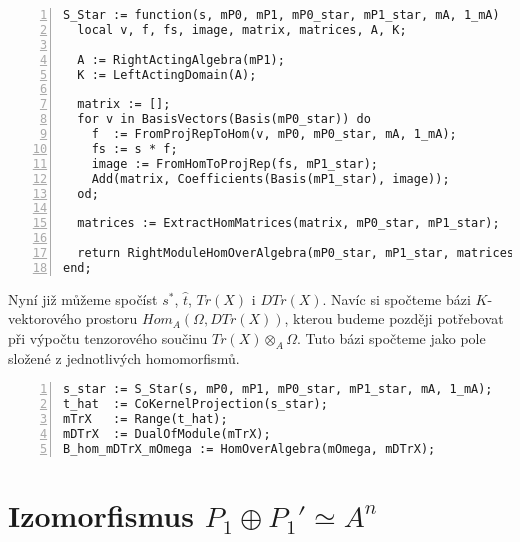       \begin{Verbatim}[frame=single,numbers=left]
S_Star := function(s, mP0, mP1, mP0_star, mP1_star, mA, 1_mA)
  local v, f, fs, image, matrix, matrices, A, K;

  A := RightActingAlgebra(mP1);
  K := LeftActingDomain(A);

  matrix := [];
  for v in BasisVectors(Basis(mP0_star)) do
    f  := FromProjRepToHom(v, mP0, mP0_star, mA, 1_mA);
    fs := s * f;
    image := FromHomToProjRep(fs, mP1_star);
    Add(matrix, Coefficients(Basis(mP1_star), image));
  od;

  matrices := ExtractHomMatrices(matrix, mP0_star, mP1_star);

  return RightModuleHomOverAlgebra(mP0_star, mP1_star, matrices);
end;        
      \end{Verbatim}
      
      
      Nyní již můžeme spočíst $s^*$, $\hat t$, $Tr(X)$ i $DTr(X)$. Navíc si spočteme 
      bázi $K$-vektorového prostoru $Hom_A(\Omega, DTr(X))$, kterou budeme 
       později potřebovat při výpočtu tenzorového součinu $Tr(X)\otimes_A \Omega$. 
       Tuto bázi spočteme jako pole složené z jednotlivých homomorfismů.
    
      \begin{Verbatim}[frame=single,numbers=left]
s_star := S_Star(s, mP0, mP1, mP0_star, mP1_star, mA, 1_mA);
t_hat  := CoKernelProjection(s_star);
mTrX   := Range(t_hat);
mDTrX  := DualOfModule(mTrX);
B_hom_mDTrX_mOmega := HomOverAlgebra(mOmega, mDTrX);
      \end{Verbatim}      
                  
  \section{Izomorfismus $P_1\oplus P_1' \simeq A^n$}\label{algoritmus-P1P1sA-izo}
  
